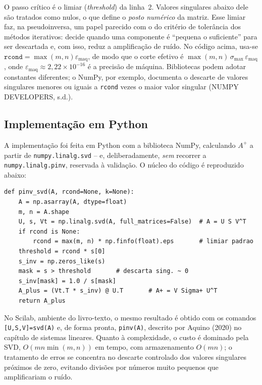 \documentclass[12pt,a4paper,oneside]{report}
\newcommand{\Ap}{A^{+}}
\begin{document}
O passo crítico é o limiar (\emph{threshold}) da linha~2. Valores singulares abaixo dele são
tratados como nulos, o que define o \emph{posto numérico} da matriz. Esse limiar faz, na pseudoinversa, um papel parecido com o do critério de tolerância dos métodos iterativos: decide quando uma componente é ``pequena o suficiente'' para ser descartada e, com isso, reduz a amplificação de ruído. No código acima, usa-se
$\texttt{rcond}=\max(m,n)\varepsilon_{\text{maq}}$, de modo que o corte efetivo é
$\max(m,n)\,\sigma_{\max}\,\varepsilon_{\text{maq}}$, onde
$\varepsilon_{\text{maq}} \approx 2{,}22\times 10^{-16}$ é a precisão de máquina. Bibliotecas podem adotar constantes diferentes; o NumPy, por exemplo, documenta o descarte de valores singulares menores ou iguais a \texttt{rcond} vezes o maior valor singular (NUMPY DEVELOPERS, s.d.).

\subsection{Implementação em Python}

A implementação foi feita em Python com a biblioteca NumPy, calculando $\Ap$ a partir de
\texttt{numpy.linalg.svd} -- e, deliberadamente, \emph{sem} recorrer a
\texttt{numpy.linalg.pinv}, reservada à validação. O núcleo do código é reproduzido abaixo:

\begin{lstlisting}[caption={Nucleo da implementacao usada nos testes},captionpos=b]
def pinv_svd(A, rcond=None, k=None):
    A = np.asarray(A, dtype=float)
    m, n = A.shape
    U, s, Vt = np.linalg.svd(A, full_matrices=False)  # A = U S V^T
    if rcond is None:
        rcond = max(m, n) * np.finfo(float).eps       # limiar padrao
    threshold = rcond * s[0]
    s_inv = np.zeros_like(s)
    mask = s > threshold       # descarta sing. ~ 0
    s_inv[mask] = 1.0 / s[mask]
    A_plus = (Vt.T * s_inv) @ U.T       # A+ = V Sigma+ U^T
    return A_plus
\end{lstlisting}

No Scilab, ambiente do livro-texto, o mesmo resultado é obtido com os comandos
\texttt{[U,S,V]=svd(A)} e, de forma pronta, \texttt{pinv(A)}, descrito por Aquino (2020) no
capítulo de sistemas lineares. Quanto à complexidade, o custo é dominado pela SVD,
$O\!\left(m n \min(m,n)\right)$ em tempo, com armazenamento $O(mn)$; o tratamento de erros se
concentra no descarte controlado dos valores singulares próximos de zero, evitando divisões
por números muito pequenos que amplificariam o ruído.
\end{document}
